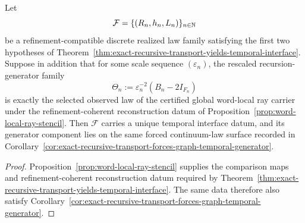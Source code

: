 \begin{corollary}
\label{cor:certified-local-ray-recursion-closes-temporal-bridge}
Let
\[
\mathcal F=\{(R_n,h_n,L_n)\}_{n\in\mathbb{N}}
\]
be a refinement-compatible discrete realized law family satisfying the first
two hypotheses of
Theorem~\ref{thm:exact-recursive-transport-yields-temporal-interface}. Suppose
in addition that for some scale sequence \((\varepsilon_n)\), the rescaled
recursion-generator family
\[
\Theta_n:=\varepsilon_n^{-2}(B_n-2I_{F_n})
\]
is exactly the selected observed law of the certified global word-local ray
carrier under the refinement-coherent reconstruction datum of
Proposition~\ref{prop:word-local-ray-stencil}. Then \(\mathcal F\) carries a
unique temporal interface datum, and its generator component lies on the
same forced continuum-law surface recorded in
Corollary~\ref{cor:exact-recursive-transport-forces-graph-temporal-generator}.
\end{corollary}

\begin{proof}
Proposition~\ref{prop:word-local-ray-stencil} supplies the comparison maps and
refinement-coherent reconstruction datum required by
Theorem~\ref{thm:exact-recursive-transport-yields-temporal-interface}. The same
data therefore also satisfy
Corollary~\ref{cor:exact-recursive-transport-forces-graph-temporal-generator}.
\end{proof}

